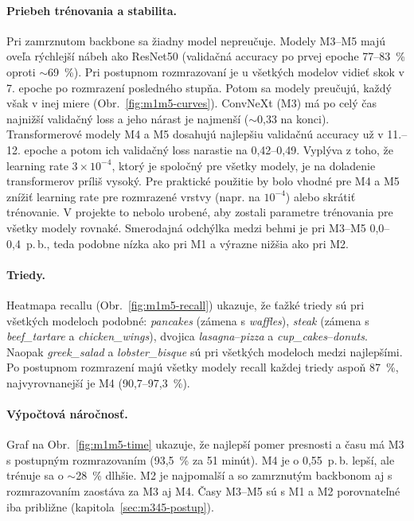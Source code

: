 \paragraph{Priebeh trénovania a stabilita.} Pri zamrznutom backbone sa
žiadny model nepreučuje. Modely M3--M5 majú oveľa rýchlejší nábeh ako
ResNet50 (validačná accuracy po prvej epoche 77--83~\% oproti
$\sim$69~\%). Pri postupnom rozmrazovaní je u všetkých modelov vidieť
skok v 7. epoche po rozmrazení posledného stupňa. Potom sa modely
preučujú, každý však v inej miere (Obr.~\ref{fig:m1m5-curves}).
ConvNeXt (M3) má po celý čas najnižší validačný loss a jeho nárast je
najmenší ($\sim$0,33 na konci). Transformerové modely M4 a M5 dosahujú
najlepšiu validačnú accuracy už v 11.--12. epoche a potom ich validačný
loss narastie na 0,42--0,49. Vyplýva z toho, že learning rate
$3\times10^{-4}$, ktorý je spoločný pre všetky modely, je na doladenie
transformerov príliš vysoký. Pre praktické použitie by bolo vhodné pre M4
a M5 znížiť learning rate pre rozmrazené vrstvy (napr. na $10^{-4}$) alebo
skrátiť trénovanie. V projekte to nebolo urobené, aby zostali parametre
trénovania pre všetky modely rovnaké. Smerodajná odchýlka medzi behmi je
pri M3--M5 0,0--0,4~p.\,b., teda podobne nízka ako pri M1 a výrazne nižšia
ako pri M2.

\paragraph{Triedy.} Heatmapa recallu (Obr.~\ref{fig:m1m5-recall}) ukazuje,
že ťažké triedy sú pri všetkých modeloch podobné: \emph{pancakes}
(zámena s \emph{waffles}), \emph{steak} (zámena s \emph{beef\_tartare}
a \emph{chicken\_wings}), dvojica \emph{lasagna}--\emph{pizza}
a \emph{cup\_cakes}--\emph{donuts}. Naopak \emph{greek\_salad}
a \emph{lobster\_bisque} sú pri všetkých modeloch medzi najlepšími. Po
postupnom rozmrazení majú všetky modely recall každej triedy aspoň
87~\%, najvyrovnanejší je M4 (90,7--97,3~\%).

\paragraph{Výpočtová náročnosť.} Graf na Obr.~\ref{fig:m1m5-time} ukazuje,
že najlepší pomer presnosti a času má M3 s postupným rozmrazovaním
(93,5~\% za 51 minút). M4 je o 0,55~p.\,b. lepší, ale trénuje sa
o $\sim$28~\% dlhšie. M2 je najpomalší a so zamrznutým backbonom aj
s rozmrazovaním zaostáva za M3 aj M4. Časy M3--M5 sú s M1 a M2
porovnateľné iba približne (kapitola~\ref{sec:m345-postup}).

